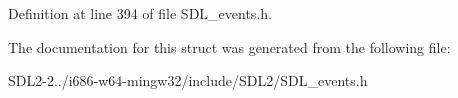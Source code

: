 Definition at line 394 of file S\+D\+L\+\_\+events.\+h.



The documentation for this struct was generated from the following file\+:\begin{DoxyCompactItemize}
\item 
S\+D\+L2-\/2../i686-\/w64-\/mingw32/include/\+S\+D\+L2/S\+D\+L\+\_\+events.\+h\end{DoxyCompactItemize}

